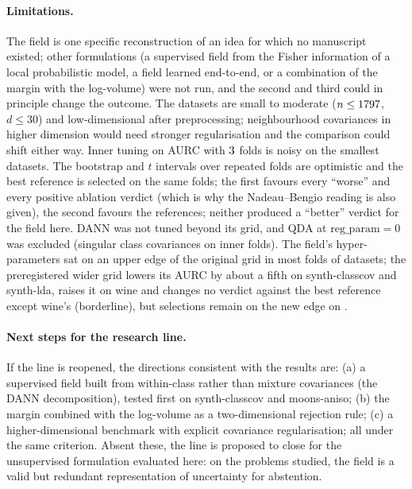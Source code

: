 \documentclass[10pt,a4paper]{article}
\theoremstyle{plain}
\theoremstyle{definition}
\theoremstyle{remark}
\begin{document}
\paragraph{Limitations.} The field is one specific reconstruction of an idea for which no manuscript existed; other formulations (a supervised field from the Fisher information of a local probabilistic model, a field learned end-to-end, or a combination of the margin with the log-volume) were not run, and the second and third could in principle change the outcome. The datasets are small to moderate ($n\le1797$, $d\le30$) and low-dimensional after preprocessing; neighbourhood covariances in higher dimension would need stronger regularisation and the comparison could shift either way. Inner tuning on AURC with $3$ folds is noisy on the smallest datasets. The bootstrap and $t$ intervals over repeated folds are optimistic and the best reference is selected on the same folds; the first favours every ``worse'' and every positive ablation verdict (which is why the Nadeau--Bengio reading is also given), the second favours the references; neither produced a ``better'' verdict for the field here. DANN was not tuned beyond its grid, and QDA at $\mathrm{reg\_param}=0$ was excluded (singular class covariances on inner folds). The field's hyper-parameters sat on an upper edge of the original grid in most folds of \VTwoSatFanisoDsHighN{} datasets; the preregistered wider grid lowers its AURC by about a fifth on synth-classcov and synth-lda, raises it on wine and changes no verdict against the best reference except wine's (borderline), but selections remain on the new edge on \SatFanisoDsHighList.

\paragraph{Next steps for the research line.} If the line is reopened, the directions consistent with the results are: (a) a supervised field built from within-class rather than mixture covariances (the DANN decomposition), tested first on synth-classcov and moons-aniso; (b) the margin combined with the log-volume as a two-dimensional rejection rule; (c) a higher-dimensional benchmark with explicit covariance regularisation; all under the same criterion. Absent these, the line is proposed to close for the unsupervised formulation evaluated here: on the problems studied, the field is a valid but redundant representation of uncertainty for abstention.

\FloatBarrier
\appendix
\end{document}
